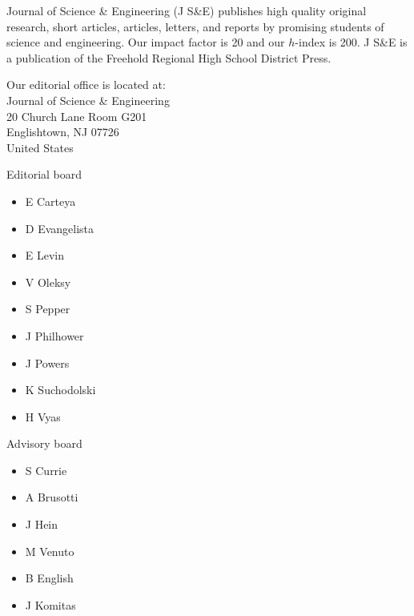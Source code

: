 \documentclass[letterpaper,11pt,twoside,electronic,headers=exceptpdf,papers=countpages,linkcolor=blue,urlcolor=blue]{confproc}
\author{\procpdfauthor}
\title{\procpdftitle}
\date{\today}
\begin{document}
\frontmatter
\setcounter{page}{1}
{}
\newpage
\noindent Journal of Science \& Engineering (J S\&E) publishes high quality original research, short articles, articles, letters, and reports by promising students of science and engineering.  Our impact factor is 20 and our $h$-index is 200.  J S\&E is a publication of the Freehold Regional High School District Press. 
\vspace{2ex}

\noindent Our editorial office is located at:\\

\noindent Journal of Science \& Engineering\\20 Church Lane Room G201\\Englishtown, NJ 07726\\United States
\vspace{2ex}

\noindent\small Editorial board
\begin{itemize}
\itemsep-0.5em
\item[] E Carteya
\item[] D Evangelista
\item[] E Levin
\item[] V Oleksy
\item[] S Pepper
\item[] J Philhower
\item[] J Powers
\item[] K Suchodolski
\item[] H Vyas
\end{itemize}

\noindent\small Advisory board
\begin{itemize}
\itemsep-0.5em
\item[] S Currie
\item[] A Brusotti
\item[] J Hein
\item[] M Venuto
\item[] B English
\item[] J Komitas
\end{itemize}

\vfill

\vspace{2ex}
\end{document}
